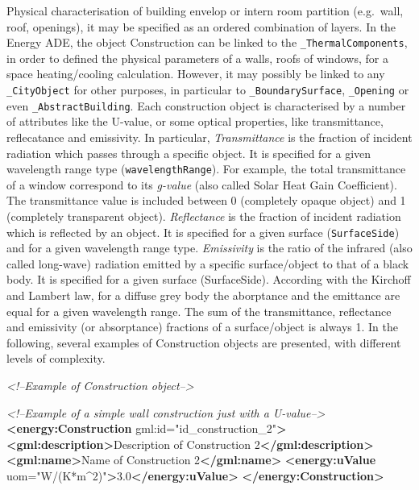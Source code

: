 \documentclass[a4paper,12pt]{article}
\newenvironment{Shaded}{}{}
\newcommand{\KeywordTok}[1]{\textcolor[rgb]{0.00,0.44,0.13}{\textbf{{#1}}}}
\newcommand{\StringTok}[1]{\textcolor[rgb]{0.25,0.44,0.63}{{#1}}}
\newcommand{\CommentTok}[1]{\textcolor[rgb]{0.38,0.63,0.69}{\textit{{#1}}}}
\newcommand{\OtherTok}[1]{\textcolor[rgb]{0.00,0.44,0.13}{{#1}}}
\newcommand{\NormalTok}[1]{{#1}}
\begin{document}
Physical characterisation of building envelop or intern room partition
(e.g.~wall, roof, openings), it may be specified as an ordered
combination of layers. In the Energy ADE, the object Construction can be
linked to the \texttt{\_ThermalComponents}, in order to defined the
physical parameters of a walls, roofs of windows, for a space
heating/cooling calculation. However, it may possibly be linked to any
\texttt{\_CityObject} for other purposes, in particular to
\texttt{\_BoundarySurface}, \texttt{\_Opening} or even
\texttt{\_AbstractBuilding}. Each construction object is characterised
by a number of attributes like the U-value, or some optical properties,
like transmittance, reflecatance and emissivity. In particular,
\emph{Transmittance} is the fraction of incident radiation which passes
through a specific object. It is specified for a given wavelength range
type (\texttt{wavelengthRange}). For example, the total transmittance of
a window correspond to its \emph{g-value} (also called Solar Heat Gain
Coefficient). The transmittance value is included between 0 (completely
opaque object) and 1 (completely transparent object). \emph{Reflectance}
is the fraction of incident radiation which is reflected by an object.
It is specified for a given surface (\texttt{SurfaceSide}) and for a
given wavelength range type. \emph{Emissivity} is the ratio of the
infrared (also called long-wave) radiation emitted by a specific
surface/object to that of a black body. It is specified for a given
surface (SurfaceSide). According with the Kirchoff and Lambert law, for
a diffuse grey body the aborptance and the emittance are equal for a
given wavelength range. The sum of the transmittance, reflectance and
emissivity (or absorptance) fractions of a surface/object is always 1.
In the following, several examples of Construction objects are
presented, with different levels of complexity.

\begin{Shaded}
\begin{Highlighting}[]
\CommentTok{<!--Example of Construction object-->}
\end{Highlighting}
\end{Shaded}

\begin{Shaded}
\begin{Highlighting}[]
\CommentTok{<!--Example of a simple wall construction just with a U-value-->}
\KeywordTok{<energy:Construction}\OtherTok{ gml:id=}\StringTok{"id_construction_2"}\KeywordTok{>}
    \KeywordTok{<gml:description>}\NormalTok{Description of Construction 2}\KeywordTok{</gml:description>}
    \KeywordTok{<gml:name>}\NormalTok{Name of Construction 2}\KeywordTok{</gml:name>}
    \KeywordTok{<energy:uValue}\OtherTok{ uom=}\StringTok{"W/(K*m^2)"}\KeywordTok{>}\NormalTok{3.0}\KeywordTok{</energy:uValue>}
\KeywordTok{</energy:Construction>}
\end{Highlighting}
\end{Shaded}
\end{document}
